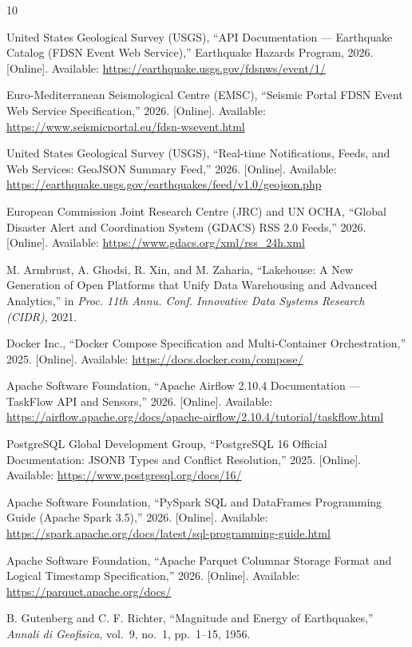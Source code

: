 \clearpage
\raggedbottom
\begin{thebibliography}{10}

United States Geological Survey (USGS), ``API Documentation --- Earthquake Catalog (FDSN Event Web Service),'' Earthquake Hazards Program, 2026. [Online]. Available: \url{https://earthquake.usgs.gov/fdsnws/event/1/}

Euro-Mediterranean Seismological Centre (EMSC), ``Seismic Portal FDSN Event Web Service Specification,'' 2026. [Online]. Available: \url{https://www.seismicportal.eu/fdsn-wsevent.html}

United States Geological Survey (USGS), ``Real-time Notifications, Feeds, and Web Services: GeoJSON Summary Feed,'' 2026. [Online]. Available: \url{https://earthquake.usgs.gov/earthquakes/feed/v1.0/geojson.php}

European Commission Joint Research Centre (JRC) and UN OCHA, ``Global Disaster Alert and Coordination System (GDACS) RSS 2.0 Feeds,'' 2026. [Online]. Available: \url{https://www.gdacs.org/xml/rss_24h.xml}

M. Armbrust, A. Ghodsi, R. Xin, and M. Zaharia, ``Lakehouse: A New Generation of Open Platforms that Unify Data Warehousing and Advanced Analytics,'' in \emph{Proc. 11th Annu. Conf. Innovative Data Systems Research (CIDR)}, 2021.

Docker Inc., ``Docker Compose Specification and Multi-Container Orchestration,'' 2025. [Online]. Available: \url{https://docs.docker.com/compose/}

Apache Software Foundation, ``Apache Airflow 2.10.4 Documentation --- TaskFlow API and Sensors,'' 2026. [Online]. Available: \url{https://airflow.apache.org/docs/apache-airflow/2.10.4/tutorial/taskflow.html}

PostgreSQL Global Development Group, ``PostgreSQL 16 Official Documentation: JSONB Types and Conflict Resolution,'' 2025. [Online]. Available: \url{https://www.postgresql.org/docs/16/}

Apache Software Foundation, ``PySpark SQL and DataFrames Programming Guide (Apache Spark 3.5),'' 2026. [Online]. Available: \url{https://spark.apache.org/docs/latest/sql-programming-guide.html}

Apache Software Foundation, ``Apache Parquet Columnar Storage Format and Logical Timestamp Specification,'' 2026. [Online]. Available: \url{https://parquet.apache.org/docs/}

B. Gutenberg and C. F. Richter, ``Magnitude and Energy of Earthquakes,'' \emph{Annali di Geofisica}, vol.~9, no.~1, pp.~1--15, 1956.

\end{thebibliography}
